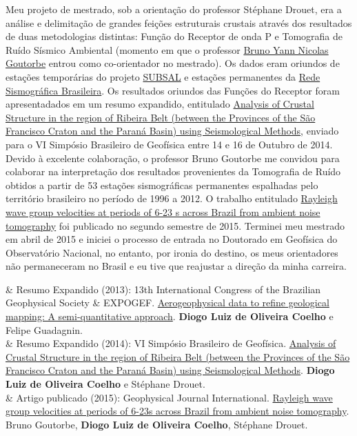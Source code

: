 \documentclass[10pt,a4paper,oneside]{book}
\begin{document}
Meu projeto de mestrado, sob a orientação do professor Stéphane Drouet, era a análise e delimitação de grandes feições estruturais crustais através dos resultados de duas metodologias distintas: Função do Receptor de onda P e Tomografia de Ruído Sísmico Ambiental (momento em que o professor \href{http://lattes.cnpq.br/5754348793953158}{Bruno Yann Nicolas Goutorbe} entrou como co-orientador no mestrado). Os dados eram oriundos de estações temporárias do projeto \href{http://www.pegbr.on.br:8080/pegbr/visualizar/SolicitacaoDadosProjeto.jsp?cod=74}{SUBSAL} e estações permanentes da \href{www.rsbr.on.br}{Rede Sismográfica Brasileira}. Os resultados oriundos das Funções do Receptor foram apresentadados em um resumo expandido, entitulado \href{http://dx.doi.org/10.22564/6simbgf2014.043}{Analysis of Crustal Structure in the region of Ribeira Belt (between the Provinces of the São Francisco Craton and the Paraná Basin) using Seismological Methods}, enviado para o VI Simpósio Brasileiro de Geofísica entre 14 e 16 de Outubro de 2014. Devido à excelente colaboração, o professor Bruno Goutorbe me convidou para colaborar na interpretação dos resultados provenientes da Tomografia de Ruído obtidos a partir de 53 estações sismográficas permanentes espalhadas pelo território brasileiro no período de 1996 a 2012. O trabalho entitulado \href{http://dx.doi.org/10.1093/gji/ggv343}{Rayleigh wave group velocities at periods of 6-23 s across Brazil from ambient noise tomography} foi publicado no segundo semestre de 2015. Terminei meu mestrado em abril de 2015 e iniciei o processo de entrada no Doutorado em Geofísica do Observatório Nacional, no entanto, por ironia do destino, os meus orientadores não permaneceram no Brasil e eu tive que reajustar a direção da minha carreira.

\bigskip

\begin{summarybox}[frametitle=\faBookmark{}\quad Resumo de atividades científicas]
	\begin{fa-ul}
		\faBook & Resumo Expandido (2013): 13th International Congress of the Brazilian Geophysical Society \& EXPOGEF. \href{https://doi.org/10.1190/sbgf2013-129}{Aerogeophysical data to refine geological mapping: A semi-quantitative approach}. \textbf{Diogo Luiz de Oliveira Coelho} e Felipe Guadagnin. \\
		\faBook & Resumo Expandido (2014): VI Simpósio Brasileiro de Geofísica. \href{http://dx.doi.org/10.22564/6simbgf2014.043}{Analysis of Crustal Structure in the region of Ribeira Belt (between the Provinces of the São Francisco Craton and the Paraná Basin) using Seismological Methods}. \textbf{Diogo Luiz de Oliveira Coelho} e Stéphane Drouet. \\
		\faBook & Artigo publicado (2015): Geophysical Journal International. \href{http://dx.doi.org/10.1093/gji/ggv343}{Rayleigh wave group velocities at periods of 6-23s across Brazil from ambient noise tomography}. Bruno Goutorbe, \textbf{Diogo Luiz de Oliveira Coelho}, Stéphane Drouet. 
	\end{fa-ul}
\end{summarybox}
\end{document}
